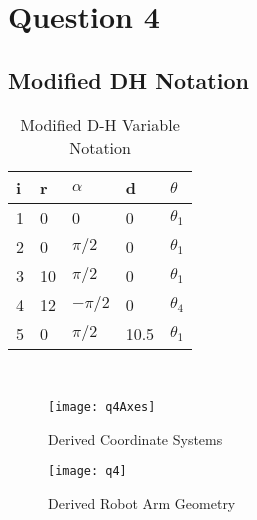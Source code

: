 \newpage
\section{Question 4}
	\subsection{Modified DH Notation}
	\noindent
	\begin{table}[position = here]
		\begin{centering}
			\begin{tabular}{||l|l|l|l|l||}
				\hline \rule[-2ex]{0pt}{5.5ex} \color{red}\bf{i} & \color{red}\bf{r}		&	\color{red}\bf{$\alpha$}	&	\color{red}\bf{d}	&	\color{red}\bf{$\theta$}\\ 
				\hline \rule[-2ex]{0pt}{5.5ex} 1 & 0	&	0		&	0		&	$\theta_{1}$\\	
				\hline \rule[-2ex]{0pt}{5.5ex} 2 & 0	&	$\pi/2$	&	0		&	$\theta_{1}$\\
				\hline \rule[-2ex]{0pt}{5.5ex} 3 & 10	&	$\pi/2$	&	0		&	$\theta_{1}$\\
				\hline \rule[-2ex]{0pt}{5.5ex} 4 & 12	&	$-\pi/2$&	0		&	$\theta_{4}$\\
				\hline \rule[-2ex]{0pt}{5.5ex} 5 & 0	&	$\pi/2$	&	10.5	&	$\theta_{1}$\\
				\hline 
			\end{tabular}\\
		\end{centering}
		\begin{flushleft}
			\caption [DHVariables] {Modified D-H Variable Notation}
		\end{flushleft}
	\end{table}
	
		\begin{figure}[position = here]
			\begin{centering}
				\texttt{[image: q4Axes]}\\
				\caption [DHDrawing]{Derived Coordinate Systems}
			\end{centering}
		\end{figure}
		
		\begin{figure}[position = here]
			\begin{centering}
				\texttt{[image: q4]}\\
				\caption [DHDrawing]{Derived Robot Arm Geometry}
			\end{centering}
		\end{figure}